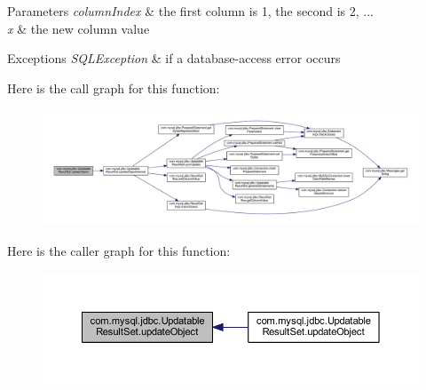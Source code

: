 \begin{DoxyParams}{Parameters}
{\em column\+Index} & the first column is 1, the second is 2, ... \\
\hline
{\em x} & the new column value\\
\hline
\end{DoxyParams}

\begin{DoxyExceptions}{Exceptions}
{\em S\+Q\+L\+Exception} & if a database-\/access error occurs \\
\hline
\end{DoxyExceptions}
Here is the call graph for this function\+:
\nopagebreak
\begin{figure}[H]
\begin{center}
\leavevmode
\includegraphics[width=350pt]{classcom_1_1mysql_1_1jdbc_1_1_updatable_result_set_aa7aa1f38330acdf684c1b9d8e8c2fb95_cgraph}
\end{center}
\end{figure}
Here is the caller graph for this function\+:
\nopagebreak
\begin{figure}[H]
\begin{center}
\leavevmode
\includegraphics[width=350pt]{classcom_1_1mysql_1_1jdbc_1_1_updatable_result_set_aa7aa1f38330acdf684c1b9d8e8c2fb95_icgraph}
\end{center}
\end{figure}
\mbox{\label{classcom_1_1mysql_1_1jdbc_1_1_updatable_result_set_ae3c19f739c122b5b6766b868f6bc39a6}} 
